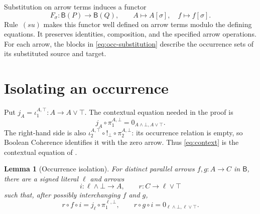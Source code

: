 \documentclass[11pt]{article}
\newtheorem{lemma}[theorem]{Lemma}
\newcommand{\B}{\mathsf B}
\begin{document}
Substitution on arrow terms induces a functor
\[
 F_\sigma:\B(P)\longrightarrow\B(Q),\qquad
 A\longmapsto A[\sigma],\quad f\longmapsto f[\sigma].
\]
Rule~$(su)$ makes this functor well defined on arrow terms modulo the
defining equations. It preserves identities, composition, and the
specified arrow operations. For each arrow, the blocks in
\eqref{eq:occ-substitution} describe the occurrence sets of its
substituted source and target.

\section{Isolating an occurrence}\label{sec:isolation}

Put $j_A=\iota_1^{A,\top}:A\to A\vee\top$. The contextual equation
needed in the proof is
\begin{equation}
 j_A\circ\pi_1^{A,\bot}
   =0_{A\wedge\bot,A\vee\top}.
 \tag{$K_A$}\label{eq:context}
\end{equation}
The right-hand side is also
$\iota_2^{A,\top}\circ!_\bot\circ\pi_2^{A,\bot}$: its occurrence
relation is empty, so Boolean Coherence identifies it with the zero
arrow. Thus \eqref{eq:context} is the contextual equation of
\cite[\S9.7, pp.~215--216]{DP}.

\begin{lemma}[Occurrence isolation]\label{lem:isolation}
For distinct parallel arrows $f,g:A\to C$ in $\B$, there are a
signed literal $\ell$ and arrows
\[
 i:\ell\wedge\bot\longrightarrow A,
 \qquad r:C\longrightarrow\ell\vee\top
\]
such that, after possibly interchanging $f$ and $g$,
\[
 r\circ f\circ i=j_\ell\circ\pi_1^{\ell,\bot},
 \qquad
 r\circ g\circ i=0_{\ell\wedge\bot,\ell\vee\top}.
\]
\end{lemma}
\end{document}
